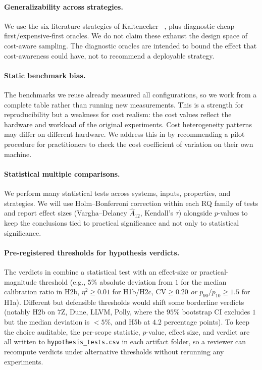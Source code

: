 \paragraph*{Generalizability across strategies.}
We use the six literature strategies of Kaltenecker
\etal~\cite{kaltenecker2019}, plus diagnostic cheap-first/expensive-first
oracles. We do not claim these exhaust the design space of cost-aware
sampling. The diagnostic oracles are intended to bound the effect that
cost-awareness could have, not to recommend a deployable strategy.

\paragraph*{Static benchmark bias.}
The benchmarks we reuse already measured all configurations, so we work from
a complete table rather than running new measurements. This is a strength for
reproducibility but a weakness for cost realism: the cost values reflect the
hardware and workload of the original experiments. Cost heterogeneity
patterns may differ on different hardware. We address this in
 by recommending a pilot procedure for practitioners to
check the cost coefficient of variation on their own machine.

\paragraph*{Statistical multiple comparisons.}
We perform many statistical tests across systems, inputs, properties, and
strategies. We will use Holm--Bonferroni correction within each RQ family of
tests and report effect sizes (Vargha--Delaney $\hat A_{12}$,
Kendall's $\tau$) alongside $p$-values to keep the conclusions tied to
practical significance and not only to statistical significance.

\paragraph*{Pre-registered thresholds for hypothesis verdicts.}
The verdicts in  combine a statistical
test with an effect-size or practical-magnitude threshold (e.g., $5\%$
absolute deviation from $1$ for the median calibration ratio in H2b,
$\eta^2\geq 0.01$ for H1b/H2c, $\mathrm{CV}\geq 0.20$ \emph{or}
$p_{90}/p_{10}\geq 1.5$ for H1a). Different but defensible thresholds
would shift some borderline verdicts (notably H2b on $7$Z, Dune, LLVM,
Polly, where the $95\%$ bootstrap CI excludes $1$ but the median
deviation is $<\!\!5\%$, and H5b at $4.2$ percentage points). To
keep the choice auditable, the per-scope statistic, $p$-value, effect
size, and verdict are all written to \texttt{hypothesis\_tests.csv} in
each artifact folder, so a reviewer can recompute verdicts under
alternative thresholds without rerunning any experiments.
